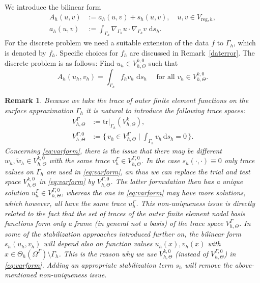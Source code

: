 \documentclass[final]{siamltex}
\newtheorem{remark}{Remark}
\begin{document}
We introduce the bilinear form 
\begin{align}
 A_h(u,v) & := a_h(u,v)+ s_h(u,v), \quad u,v \in {V_{\text{reg},h}}, \label{eq:blf2} \\
 a_h(u,v) & := \int_{\Gamma_h} \nabla_{\Gamma_h} u \cdot \nabla_{\Gamma_h} v \, {\,\mathrm{d} {s_h}} \label{eq:blf3}.
\end{align}
For the discrete problem we need a suitable extension of the data $f$ to $\Gamma_h$, which is denoted by $f_h$. Specific choices for $f_h$ are discussed in Remark~\ref{daterror}. 
The discrete problem is as follows: 
Find $u_h \in {V_{h,\Theta}^{k,0}}$ such that 
\begin{equation} \label{eq:varform} 
 A_h(u_h,v_h) = \int_{\Gamma_h} f_h v_h \, {\,\mathrm{d} {s_h}} \quad \text{ for all } v_h \in {V_{h,\Theta}^{k,0}}.
\end{equation}

\begin{remark} \label{remnonunique} \rm Because we take the trace of outer finite element functions on the surface approximation $\Gamma_h$ it is natural to introduce the following trace spaces:
\begin{equation} \label{tracespace}
 \begin{split}
V_{h,\Theta}^\Gamma & := \text{tr}|_{\Gamma_h} (V_{h,\Theta}^k), \\
 V_{h,\Theta}^{\Gamma,0} & := \{\, v_h \in V_{h,\Theta}^\Gamma \mid \int_{\Gamma_h} v_h {\,\mathrm{d} {s_h}}=0\,\}.
\end{split} 
\end{equation}
Concerning \eqref{eq:varform}, there is the issue that there may be different $w_h,\tilde w_h\in{V_{h,\Theta}^{k,0}}$ with the same trace $v_h^\Gamma \in{V_{h,\Theta}^{\Gamma,0}}$. In the case $s_h(\cdot,\cdot) \equiv 0$ only trace values on $\Gamma_h$ are used in \eqref{eq:varform}, an thus  we can replace the trial and test space $ {V_{h,\Theta}^{k,0}}$ in \eqref{eq:varform} by $V_{h,\Theta}^{\Gamma,0}$. The latter formulation then has a unique solution $u_h^\Gamma \in {V_{h,\Theta}^{\Gamma,0}}$, whereas the one in \eqref{eq:varform} may have more solutions, which however, all have the same trace $u_h^\Gamma$. This non-uniqueness issue is directly related to the fact that the set of traces of the outer finite element nodal basis functions form only a frame (in general not a basis) of the trace space $V_{h,\Theta}^\Gamma $. In some of the stabilization approaches introduced further on, the bilinear form $s_h(u_h,v_h)$ will depend also on function values $u_h(x),v_h(x)$ with $x \in \Theta_h(\Omega^\Gamma) \setminus \Gamma_h$. This is the reason why we use ${V_{h,\Theta}^{k,0}}$ (instead of ${V_{h,\Theta}^{\Gamma,0}}$) in \eqref{eq:varform}. Adding an appropriate stabilization term $s_h$ will remove the above-mentioned non-uniqueness issue. 
\end{remark}
\end{document}
